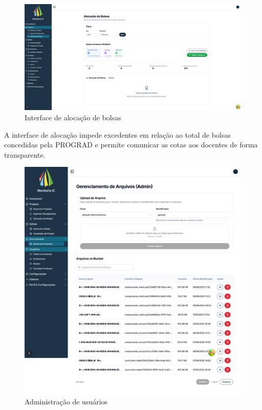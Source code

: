 \documentclass[portuguese]{sbc2025}%
\begin{document}
\begin{figure}[h!]
  \centering
  \includegraphics[width=\linewidth]{images/monitoria/admin-scholarship-allocation.png}
  \caption{Interface de alocação de bolsas}
  \label{fig:bolsas}
\end{figure}

A interface de alocação impede excedentes em relação ao total de bolsas concedidas pela PROGRAD e permite comunicar as cotas aos docentes de forma transparente.

\begin{figure}[h!]
  \centering
  \includegraphics[width=\linewidth]{images/monitoria/admin-users.png}
  \caption{Administração de usuários}
  \label{fig:admin-users}
\end{figure}
\end{document}
